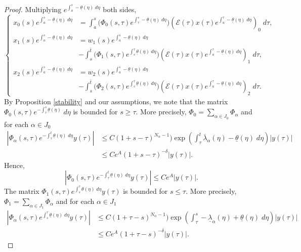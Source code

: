\documentclass[a4paper,11pt]{article}
\newcommand{\upl}{\overline{\lambda}}
\newcommand{\udl}{\underline{\lambda}}
\newcommand{\tl}{{\underline{\theta}}}
\newcommand{\E}{\mathcal{E}}
\theoremstyle{remark}
\begin{document}
\begin{proof}
Multiplying $e^{\int_a^s -\tl(\eta) \; d\eta}$ both sides,
\begin{equation} \label{integral4}
  \left\{ \begin{aligned}
           x_0(s)e^{\int_a^s -\tl(\eta) \; d\eta} &= \int_a^s \big(\Phi_0(s,\tau)e^{\int_\tau^s -\tl(\eta) \; d\eta}\big) (\E(\tau)x(\tau)e^{\int_a^\tau -\tl(\eta) \; d\eta})_0 \; d\tau,\\
           x_1(s)e^{\int_a^s -\tl(\eta) \; d\eta} &= w_1(s)e^{\int_a^s -\tl(\eta) \; d\eta} \\
           &- \int_s^{\bar{t}} \big(\Phi_1(s,\tau)e^{\int_s^\tau \tl(\eta) \; d\eta}\big) (\E(\tau)x(\tau)e^{\int_a^\tau -\tl(\eta) \; d\eta})_1 \; d\tau,\\
           x_2(s)e^{\int_a^s -\tl(\eta) \; d\eta} &= w_2(s)e^{\int_a^s -\tl(\eta) \; d\eta}\\
           &- \int_s^{\bar{t}} \big(\Phi_2(s,\tau)e^{\int_s^\tau \tl(\eta) \; d\eta}\big) (\E(\tau)x(\tau)e^{\int_a^\tau -\tl(\eta) \; d\eta})_2 \; d\tau.
          \end{aligned}\right.
\end{equation}
By Proposition \ref{stability} and our assumptions, we note that   the matrix $\Phi_0(s,\tau)e^{-\int_\tau^s \tl(\eta)}\;d\eta$  is bounded for $s\ge \tau$. More precisely,
$\Phi_0 = \displaystyle \sum_{\alpha \in J_0} \Phi_\alpha$ and for each $\alpha \in J_0$
\begin{align*}
 \left|\Phi_\alpha(s,\tau)e^{-\int_\tau^t \tl(\eta) \;d\eta}y(\tau)\right| &\le C(1 + s-\tau)^{N_\alpha-1})\exp\left(\int_\tau^t \upl_\alpha(\eta)-\tl(\eta) \;d\eta\right)|y(\tau)| \nonumber\\
 &\le Ce^A(1 + s-\tau)^{-\delta}|y(\tau)|. %
\end{align*}
Hence, $$\left|\Phi_0(s,\tau)e^{-\int_\tau^t \tl(\eta) \;d\eta}y(\tau)\right| \le Ce^A|y(\tau)|.$$
The matrix $\Phi_1(s,\tau)e^{\int_s^\tau \theta(\eta)\;d\eta}y(\tau)$ is bounded for $s\le \tau$. More precisely, $\Phi_1 = \displaystyle \sum_{\alpha \in J_1} \Phi_\alpha$ and for each $\alpha \in J_1$
\begin{align}
 \left|\Phi_\alpha(s,\tau)e^{\int_s^\tau \tl(\eta)\;d\eta}y(\tau)\right| &\le C(1 + \tau -s)^{N_\alpha-1})\exp\left(\int_\tau^s -\udl_\alpha(\eta)+\tl(\eta) \; d\eta\right)|y(\tau)| \nonumber\\
 &\le Ce^A(1 + \tau-s)^{-\delta}|y(\tau)|. \label{eq:decay1}

\end{align}
\end{proof}
\end{document}

